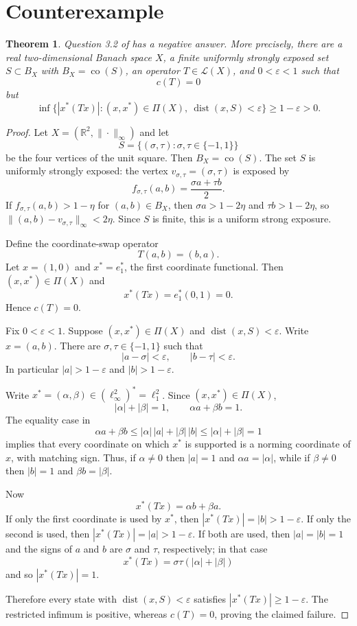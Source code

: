 \documentclass[11pt]{amsart}
\newtheorem{theorem}{Theorem}
\theoremstyle{remark}
\newcommand{\R}{\mathbb R}
\newcommand{\Lin}{\mathcal L}
\newcommand{\co}{\operatorname{co}}
\newcommand{\dist}{\operatorname{dist}}
\begin{document}
\section*{Counterexample}

\begin{theorem}
Question 3.2 of \cite{ChoiLee2022} has a negative answer.  More precisely,
there are a real two-dimensional Banach space $X$, a finite uniformly strongly
exposed set $S\subset B_X$ with $B_X=\co(S)$, an operator $T\in\Lin(X)$, and
$0<\varepsilon<1$ such that
\[
        c(T)=0
\]
but
\[
 \inf\{|x^*(Tx)|:(x,x^*)\in\Pi(X),\ \dist(x,S)<\varepsilon\}
        \ge 1-\varepsilon>0.
\]
\end{theorem}

\begin{proof}
Let $X=(\R^2,\|\cdot\|_\infty)$ and let
\[
        S=\{(\sigma,\tau):\sigma,\tau\in\{-1,1\}\}
\]
be the four vertices of the unit square.  Then $B_X=\co(S)$.
The set $S$ is uniformly strongly exposed: the vertex
$v_{\sigma,\tau}=(\sigma,\tau)$ is exposed by
\[
        f_{\sigma,\tau}(a,b)=\frac{\sigma a+\tau b}{2}.
\]
If $f_{\sigma,\tau}(a,b)>1-\eta$ for $(a,b)\in B_X$, then
$\sigma a>1-2\eta$ and $\tau b>1-2\eta$, so
$\|(a,b)-v_{\sigma,\tau}\|_\infty<2\eta$.  Since $S$ is finite, this is a
uniform strong exposure.

Define the coordinate-swap operator
\[
        T(a,b)=(b,a).
\]
Let $x=(1,0)$ and $x^*=e_1^*$, the first coordinate functional.  Then
$(x,x^*)\in\Pi(X)$ and
\[
        x^*(Tx)=e_1^*(0,1)=0.
\]
Hence $c(T)=0$.

Fix $0<\varepsilon<1$.  Suppose $(x,x^*)\in\Pi(X)$ and
$\dist(x,S)<\varepsilon$.  Write $x=(a,b)$.  There are
$\sigma,\tau\in\{-1,1\}$ such that
\[
        |a-\sigma|<\varepsilon,\qquad |b-\tau|<\varepsilon.
\]
In particular $|a|>1-\varepsilon$ and $|b|>1-\varepsilon$.

Write $x^*=(\alpha,\beta)\in(\ell_\infty^2)^*=\ell_1^2$.  Since
$(x,x^*)\in\Pi(X)$,
\[
        |\alpha|+|\beta|=1,\qquad \alpha a+\beta b=1.
\]
The equality case in
\[
        \alpha a+\beta b
        \le |\alpha|\,|a|+|\beta|\,|b|
        \le |\alpha|+|\beta|=1
\]
implies that every coordinate on which $x^*$ is supported is a norming
coordinate of $x$, with matching sign.  Thus, if $\alpha\ne0$ then
$|a|=1$ and $\alpha a=|\alpha|$, while if $\beta\ne0$ then $|b|=1$ and
$\beta b=|\beta|$.

Now
\[
        x^*(Tx)=\alpha b+\beta a.
\]
If only the first coordinate is used by $x^*$, then
$|x^*(Tx)|=|b|>1-\varepsilon$.  If only the second is used, then
$|x^*(Tx)|=|a|>1-\varepsilon$.  If both are used, then $|a|=|b|=1$ and
the signs of $a$ and $b$ are $\sigma$ and $\tau$, respectively; in that case
\[
        x^*(Tx)=\sigma\tau(|\alpha|+|\beta|)
\]
and so $|x^*(Tx)|=1$.

Therefore every state with $\dist(x,S)<\varepsilon$ satisfies
$|x^*(Tx)|\ge 1-\varepsilon$.  The restricted infimum is positive, whereas
$c(T)=0$, proving the claimed failure.
\end{proof}
\end{document}

